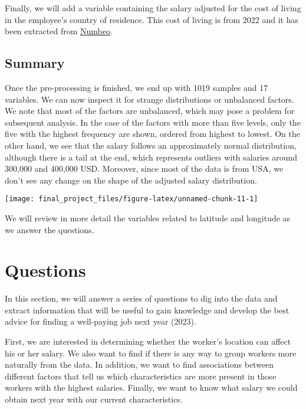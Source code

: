 \documentclass[
]{article}
\begin{document}
Finally, we will add a variable containing the salary adjusted for the
cost of living in the employee's country of residence. This cost of
living is from 2022 and it has been extracted from
\href{https://www.numbeo.com/cost-of-living}{Numbeo}.

\hypertarget{summary}{%
\subsection{Summary}\label{summary}}

Once the pre-processing is finished, we end up with 1019 samples and 17
variables. We can now inspect it for strange distributions or unbalanced
factors. We note that most of the factors are unbalanced, which may pose
a problem for subsequent analysis. In the case of the factors with more
than five levels, only the five with the highest frequency are shown,
ordered from highest to lowest. On the other hand, we see that the
salary follows an approximately normal distribution, although there is a
tail at the end, which represents outliers with salaries around 300,000
and 400,000 USD. Moreover, since most of the data is from USA, we don't
see any change on the shape of the adjusted salary distribution.

\scriptsize

\begin{center}\texttt{[image: final\_project\_files/figure-latex/unnamed-chunk-11-1]} \end{center}

\normalsize

We will review in more detail the variables related to latitude and
longitude as we answer the questions.

\hypertarget{questions}{%
\section{Questions}\label{questions}}

In this section, we will answer a series of questions to dig into the
data and extract information that will be useful to gain knowledge and
develop the best advice for finding a well-paying job next year (2023).

First, we are interested in determining whether the worker's location
can affect his or her salary. We also want to find if there is any way
to group workers more naturally from the data. In addition, we want to
find associations between different factors that tell us which
characteristics are more present in those workers with the highest
salaries. Finally, we want to know what salary we could obtain next year
with our current characteristics.
\end{document}
